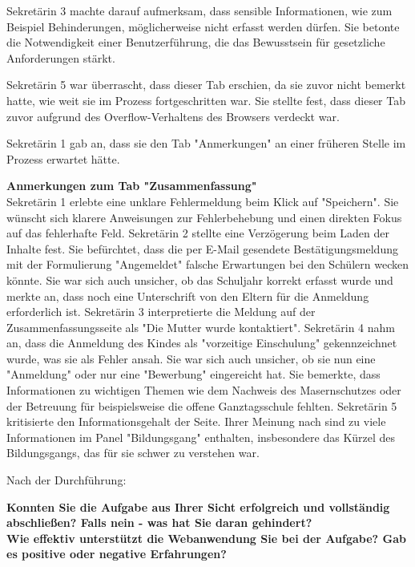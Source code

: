 Sekretärin 3 machte darauf aufmerksam, dass sensible Informationen, wie zum Beispiel Behinderungen, möglicherweise nicht erfasst werden dürfen. Sie betonte die Notwendigkeit einer Benutzerführung, die das Bewusstsein für gesetzliche Anforderungen stärkt.

Sekretärin 5 war überrascht, dass dieser Tab erschien, da sie zuvor nicht bemerkt hatte, wie weit sie im Prozess fortgeschritten war. Sie stellte fest, dass dieser Tab zuvor aufgrund des Overflow-Verhaltens des Browsers verdeckt war.

Sekretärin 1 gab an, dass sie den Tab "Anmerkungen" an einer früheren Stelle im Prozess erwartet hätte.

\textbf{Anmerkungen zum Tab "Zusammenfassung"}\\
Sekretärin 1 erlebte eine unklare Fehlermeldung beim Klick auf "Speichern". Sie wünscht sich klarere Anweisungen zur Fehlerbehebung und einen direkten Fokus auf das fehlerhafte Feld.
Sekretärin 2 stellte eine Verzögerung beim Laden der Inhalte fest. Sie befürchtet, dass die per E-Mail gesendete Bestätigungsmeldung mit der Formulierung "Angemeldet" falsche Erwartungen bei den Schülern wecken könnte. Sie war sich auch unsicher, ob das Schuljahr korrekt erfasst wurde und merkte an, dass noch eine Unterschrift von den Eltern für die Anmeldung erforderlich ist.
Sekretärin 3 interpretierte die Meldung auf der Zusammenfassungsseite als "Die Mutter wurde kontaktiert".
Sekretärin 4 nahm an, dass die Anmeldung des Kindes als "vorzeitige Einschulung" gekennzeichnet wurde, was sie als Fehler ansah. Sie war sich auch unsicher, ob sie nun eine "Anmeldung" oder nur eine "Bewerbung" eingereicht hat. Sie bemerkte, dass Informationen zu wichtigen Themen wie dem Nachweis des Masernschutzes oder der Betreuung für beispielsweise die offene Ganztagsschule fehlten.
Sekretärin 5 kritisierte den Informationsgehalt der Seite. Ihrer Meinung nach sind zu viele Informationen im Panel "Bildungsgang" enthalten, insbesondere das Kürzel des Bildungsgangs, das für sie schwer zu verstehen war.



Nach der Durchführung:

\textbf{Konnten Sie die Aufgabe aus Ihrer Sicht erfolgreich und vollständig abschließen? Falls nein - was hat Sie daran gehindert?}\\

\textbf{Wie effektiv unterstützt die Webanwendung Sie bei der Aufgabe?  Gab es positive oder negative Erfahrungen?}\\

